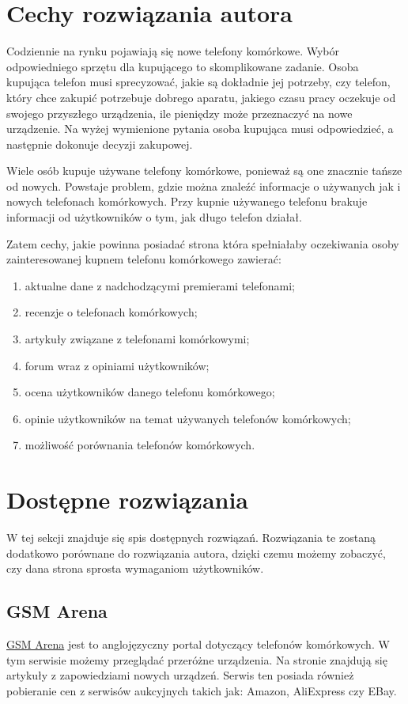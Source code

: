 \section{Cechy rozwiązania autora}\label{ideal_solution}
Codziennie na rynku pojawiają się nowe telefony komórkowe. Wybór odpowiedniego sprzętu dla kupującego to skomplikowane zadanie. Osoba kupująca telefon musi sprecyzować, jakie są dokładnie jej potrzeby, czy telefon, który chce zakupić potrzebuje dobrego aparatu, jakiego czasu pracy oczekuje od swojego przyszłego urządzenia, ile pieniędzy może przeznaczyć na nowe urządzenie. Na wyżej wymienione pytania osoba kupująca musi odpowiedzieć, a następnie dokonuje decyzji zakupowej.

Wiele osób kupuje używane telefony komórkowe, ponieważ są one znacznie tańsze od nowych. Powstaje problem, gdzie można znaleźć informacje o używanych jak i nowych telefonach komórkowych. Przy kupnie używanego telefonu brakuje informacji od użytkowników o tym, jak długo telefon działał.  

Zatem cechy, jakie powinna posiadać strona która spełniałaby oczekiwania osoby zainteresowanej kupnem telefonu komórkowego zawierać:
\begin{enumerate}
    \item aktualne dane z nadchodzącymi premierami telefonami;
    \item recenzje o telefonach komórkowych;
    \item artykuły związane z telefonami komórkowymi;
    \item forum wraz z opiniami użytkowników;
    \item ocena użytkowników danego telefonu komórkowego;
    \item opinie użytkowników na temat używanych telefonów komórkowych;
    \item możliwość porównania telefonów komórkowych.
\end{enumerate}

\section{Dostępne rozwiązania}
W tej sekcji znajduje się spis dostępnych rozwiązań. Rozwiązania te zostaną dodatkowo porównane do rozwiązania autora, dzięki czemu możemy zobaczyć, czy dana strona sprosta wymaganiom użytkowników.

\subsection{GSM Arena}
\href{https://www.gsmarena.com/}{GSM Arena} \cite{gsm_arena} jest to anglojęzyczny portal dotyczący telefonów komórkowych. W tym serwisie możemy przeglądać przeróżne urządzenia. Na stronie znajdują się artykuły z zapowiedziami nowych urządzeń. Serwis ten posiada również pobieranie cen z serwisów aukcyjnych takich jak: Amazon, AliExpress czy EBay.

